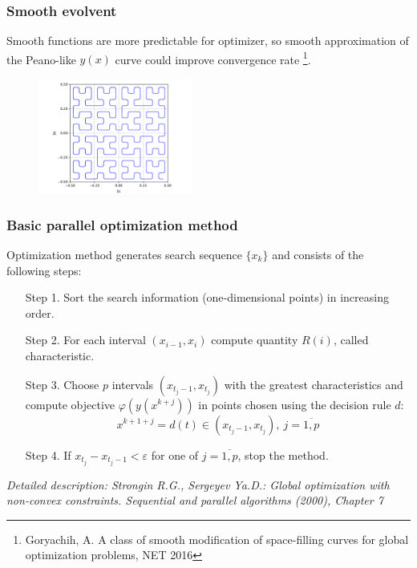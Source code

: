 \documentclass[aspectratio=1610]{beamer}
\begin{document}
\begin{frame}
  \frametitle{Smooth evolvent}
  Smooth functions are more predictable for optimizer, so smooth approximation of the Peano-like \(y(x)\) curve could improve convergence rate \footnote{Goryachih, A. A class of smooth modification of space-filling curves for global optimization problems, NET 2016}.
  \begin{figure}[ht]
    \includegraphics[width=0.45\textwidth]{smooth.pdf}
  \end{figure}

\end{frame}

\begin{frame}
  \frametitle{Basic parallel optimization method}
  Optimization method generates search sequence \(\{x_k\}\) and consists of the following steps:
  \begin{enumerate}
    \setlength{\itemindent}{.1in}
    \item[Step 1.] Sort the search information (one-dimensional points) in increasing order.
    \item[Step 2.] For each interval \((x_{i-1}, x_i)\) compute quantity \(R(i)\), called characteristic.
    \item[Step 3.] Choose \(p\) intervals \((x_{t_j-1}, x_{t_j})\) with the greatest characteristics and
    compute objective \(\varphi(y(x^{k+j}))\) in points chosen using the decision rule \(d\):
    \begin{displaymath}
      x^{k+1+j}=d(t)\in (x_{t_j-1}, x_{t_j}),\:j=\overline{1,p}
    \end{displaymath}
    \item[Step 4.] If \(x_{t_j}-x_{t_j-1}<\varepsilon\) for one of \(j=\overline{1,p}\), stop the method.
  \end{enumerate}
  \textit{\footnotesize	{Detailed description: Strongin R.G., Sergeyev Ya.D.: Global optimization with non-convex constraints. Sequential and parallel algorithms (2000), Chapter 7}}
\end{frame}
\end{document}
